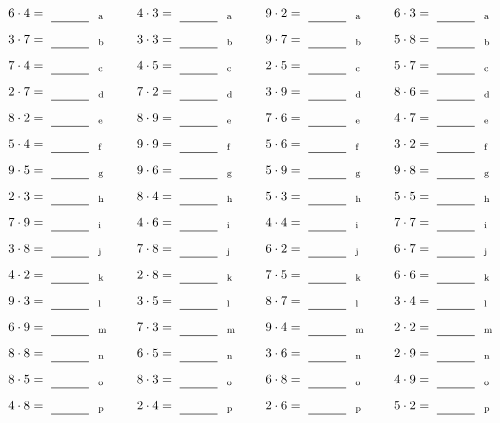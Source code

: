 \documentclass
[
  draft    = true,
  fontsize = 11pt,
  parskip  = half-
]
{scrartcl}
\begin{document}
\par\vfill\par
\begin{align*}
    \pline{6\cdot4}&=\rline{a}
  & \pline{4\cdot3}&=\rline{a}
  & \pline{9\cdot2}&=\rline{a}
  & \pline{6\cdot3}&=\rline{a} \\[1ex]
    \pline{3\cdot7}&=\rline{b}
  & \pline{3\cdot3}&=\rline{b}
  & \pline{9\cdot7}&=\rline{b}
  & \pline{5\cdot8}&=\rline{b} \\[1ex]
    \pline{7\cdot4}&=\rline{c}
  & \pline{4\cdot5}&=\rline{c}
  & \pline{2\cdot5}&=\rline{c}
  & \pline{5\cdot7}&=\rline{c} \\[1ex]
    \pline{2\cdot7}&=\rline{d}
  & \pline{7\cdot2}&=\rline{d}
  & \pline{3\cdot9}&=\rline{d}
  & \pline{8\cdot6}&=\rline{d} \\[1ex]
    \pline{8\cdot2}&=\rline{e}
  & \pline{8\cdot9}&=\rline{e}
  & \pline{7\cdot6}&=\rline{e}
  & \pline{4\cdot7}&=\rline{e} \\[1ex]
    \pline{5\cdot4}&=\rline{f}
  & \pline{9\cdot9}&=\rline{f}
  & \pline{5\cdot6}&=\rline{f}
  & \pline{3\cdot2}&=\rline{f} \\[1ex]
    \pline{9\cdot5}&=\rline{g}
  & \pline{9\cdot6}&=\rline{g}
  & \pline{5\cdot9}&=\rline{g}
  & \pline{9\cdot8}&=\rline{g} \\[1ex]
    \pline{2\cdot3}&=\rline{h}
  & \pline{8\cdot4}&=\rline{h}
  & \pline{5\cdot3}&=\rline{h}
  & \pline{5\cdot5}&=\rline{h} \\[1ex]
    \pline{7\cdot9}&=\rline{i}
  & \pline{4\cdot6}&=\rline{i}
  & \pline{4\cdot4}&=\rline{i}
  & \pline{7\cdot7}&=\rline{i} \\[1ex]
    \pline{3\cdot8}&=\rline{j}
  & \pline{7\cdot8}&=\rline{j}
  & \pline{6\cdot2}&=\rline{j}
  & \pline{6\cdot7}&=\rline{j} \\[1ex]
    \pline{4\cdot2}&=\rline{k}
  & \pline{2\cdot8}&=\rline{k}
  & \pline{7\cdot5}&=\rline{k}
  & \pline{6\cdot6}&=\rline{k} \\[1ex]
    \pline{9\cdot3}&=\rline{l}
  & \pline{3\cdot5}&=\rline{l}
  & \pline{8\cdot7}&=\rline{l}
  & \pline{3\cdot4}&=\rline{l} \\[1ex]
    \pline{6\cdot9}&=\rline{m}
  & \pline{7\cdot3}&=\rline{m}
  & \pline{9\cdot4}&=\rline{m}
  & \pline{2\cdot2}&=\rline{m} \\[1ex]
    \pline{8\cdot8}&=\rline{n}
  & \pline{6\cdot5}&=\rline{n}
  & \pline{3\cdot6}&=\rline{n}
  & \pline{2\cdot9}&=\rline{n} \\[1ex]
    \pline{8\cdot5}&=\rline{o}
  & \pline{8\cdot3}&=\rline{o}
  & \pline{6\cdot8}&=\rline{o}
  & \pline{4\cdot9}&=\rline{o} \\[1ex]
    \pline{4\cdot8}&=\rline{p}
  & \pline{2\cdot4}&=\rline{p}
  & \pline{2\cdot6}&=\rline{p}
  & \pline{5\cdot2}&=\rline{p}
\end{align*}
\end{document}
